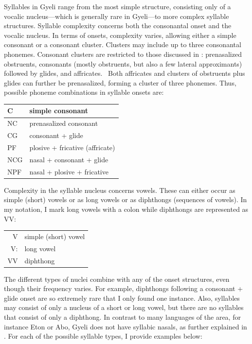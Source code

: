 \noindent Syllables in Gyeli range from the most simple structure, consisting only of a vocalic nucleus---which is generally rare in Gyeli---to more complex syllable structures. Syllable complexity concerns both the consonantal onset and the vocalic nucleus.  In terms of onsets, complexity varies, allowing either a simple consonant or a consonant cluster. Clusters may include up to three consonantal phonemes. Consonant clusters are restricted to those discussed in : prenasalized obstruents, consonants (mostly obstruents, but also a few lateral approximants) followed by glides, and affricates.%
\ Both affricates and clusters of obstruents plus glides can further be prenasalized, forming a cluster of three phonemes. Thus, possible phoneme combinations in syllable onsets are: 

\begin{center}
\begin{tabular}{ll}
C & simple consonant \\  \midrule
NC & prenasalized consonant \\
CG & consonant + glide \\ 
PF & plosive + fricative (affricate) \\  \midrule
NCG & nasal + consonant + glide \\
NPF & nasal + plosive + fricative
\end{tabular}
\end{center}

\noindent Complexity in the syllable nucleus concerns vowels. These can either occur as simple (short) vowels or as long vowels or as diphthongs (sequences of vowels). In my notation, I mark long vowels with a colon while diphthongs are represented as VV:

\begin{center}
\begin{tabular}{rl}
V & simple (short) vowel \\ \
V: & long vowel \\
VV & diphthong \\ 
\end{tabular}
\end{center}

\noindent The different types of nuclei combine with any of the onset structures, even though their frequency varies. For example, diphthongs following a consonant + glide onset are so extremely rare that I only found one instance. Also, syllables may consist of only a nucleus of a short or long vowel, but there are no syllables that consist of only a diphthong. In contrast to many languages of the area, for instance Eton or Abo, Gyeli does not have syllabic nasals, as further explained in . For each of the possible syllable types, I provide examples below: 

